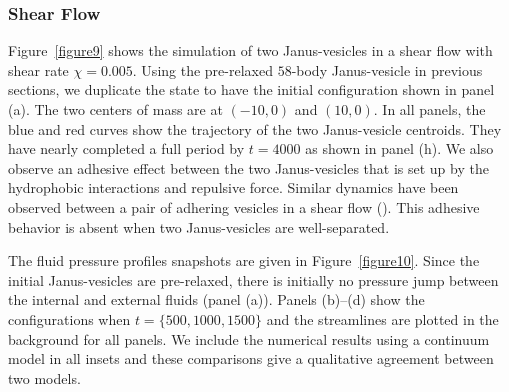 \documentclass[lineno]{jfm}
\begin{document}
\subsubsection{Shear Flow}

Figure~\ref{figure9} shows the simulation of two Janus-vesicles in a
shear flow with shear rate $\chi=0.005$. Using the pre-relaxed $58$-body
Janus-vesicle in previous sections, we duplicate the state to have the
initial configuration shown in panel (a). The two centers of mass are at
$(-10,0)$ and $(10,0)$. In all panels, the blue and red curves show the
trajectory of the two Janus-vesicle centroids. They have nearly
completed a full period by $t=4000$ as shown in panel (h). We also
observe an adhesive effect between the two Janus-vesicles that is set up
by the hydrophobic interactions and repulsive force. Similar dynamics
have been observed between a pair of adhering vesicles in a shear flow
(\cite{qua-vee-you2019, abb-far-ezz-ben-mis2021}). This adhesive
behavior is absent when two Janus-vesicles are well-separated.

The fluid pressure profiles snapshots are given in
Figure~\ref{figure10}. Since the initial Janus-vesicles are pre-relaxed,
there is initially no pressure jump between the internal and external
fluids (panel (a)). Panels (b)--(d) show the configurations when $t =
\{500,1000,1500\}$ and the streamlines are plotted in the background for
all panels. We include the numerical results using a continuum model in
all insets and these comparisons give a qualitative agreement between
two models.
\end{document}
